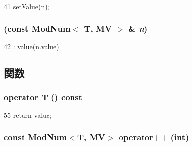 \begin{DoxyCode}
41 { setValue(n); }
\end{DoxyCode}
\hypertarget{classModNum_a6899810e3c6657d8e4b1e7d998be9b63}{
\subsubsection[{ModNum}]{ (const {\bf ModNum}$<$ T, MV $>$ \& {\em n})}}
\label{classModNum_a6899810e3c6657d8e4b1e7d998be9b63}



\begin{DoxyCode}
42 : value(n.value) {}
\end{DoxyCode}


\subsection{関数}
\hypertarget{classModNum_ae5857c1c44e69902576181d342c6b0cd}{
\subsubsection[{operator T}]{\setlength{\rightskip}{0pt plus 5cm}operator T () const}}
\label{classModNum_ae5857c1c44e69902576181d342c6b0cd}



\begin{DoxyCode}
55 { return value; }
\end{DoxyCode}
\hypertarget{classModNum_a28fee12666656f54437c465419e05853}{
\subsubsection[{operator++}]{\setlength{\rightskip}{0pt plus 5cm}const {\bf ModNum}$<$T, MV$>$ operator++ (int)}}
\label{classModNum_a28fee12666656f54437c465419e05853}



